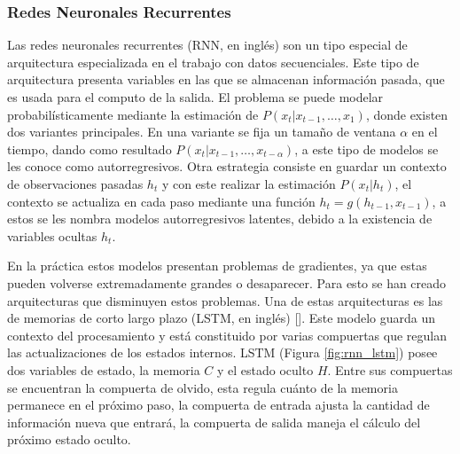 \subsubsection{Redes Neuronales Recurrentes}

Las redes neuronales recurrentes (RNN, en inglés) son
un tipo especial de arquitectura especializada en el trabajo con datos secuenciales. Este tipo de arquitectura
presenta variables en las que se almacenan información pasada, que es usada para el computo de la salida. El 
problema se puede modelar probabilísticamente mediante la estimación de $P(x_t | x_{t-1}, \dots, x_{1})$,
donde existen dos variantes principales. En una variante se fija un tamaño de ventana $\alpha$ en el tiempo, 
dando como resultado $P(x_t | x_{t-1}, \dots, x_{t-\alpha})$, a este tipo de modelos se les conoce como autorregresivos. 
Otra estrategia consiste en guardar un contexto de observaciones pasadas $h_t$ y con este realizar la estimación 
$P(x_t | h_t)$, el contexto se actualiza en cada paso mediante una función $h_t = g(h_{t-1}, x_{t-1})$, a estos 
se les nombra modelos autorregresivos latentes, debido a la existencia de variables ocultas $h_t$. 

En la práctica estos modelos presentan problemas de gradientes, ya que estas pueden volverse extremadamente grandes o 
desaparecer.
Para esto se han creado arquitecturas que disminuyen estos problemas. Una de estas arquitecturas es las de memorias
de corto largo plazo (LSTM, en inglés) [\cite{hochreiter1997long}].
Este modelo guarda un contexto del procesamiento y está constituido por varias compuertas que regulan las 
actualizaciones de los estados internos. LSTM (Figura \ref{fig:rnn_lstm}) posee dos variables de estado, la memoria 
$C$ y el estado oculto $H$. Entre sus compuertas se encuentran la compuerta de olvido, esta regula cuánto de la 
memoria permanece en el próximo paso, la compuerta de entrada ajusta la cantidad de información nueva que entrará, 
la compuerta de salida maneja el cálculo del próximo estado oculto.

